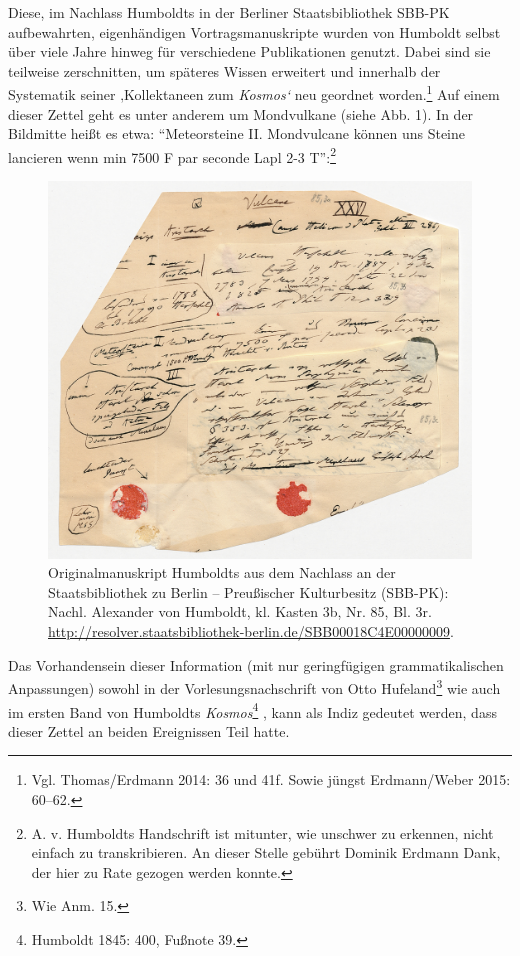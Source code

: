 \documentclass[output=paper]{langsci/langscibook}
\begin{document}
Diese, im Nachlass Humboldts in der Berliner Staatsbibliothek SBB-PK
aufbewahrten, eigenhändigen Vortragsmanuskripte wurden von Humboldt
selbst über viele Jahre hinweg für verschiedene Publikationen genutzt.
Dabei sind sie teilweise zerschnitten, um späteres Wissen erweitert und
innerhalb der Systematik seiner ‚Kollektaneen zum \emph{Kosmos`} neu
geordnet worden.\footnote{Vgl. Thomas/Erdmann 2014: 36 und 41f. Sowie
  jüngst Erdmann/Weber 2015: 60--62.} Auf einem dieser Zettel geht es
unter anderem um Mondvulkane (siehe Abb. 1). In der Bildmitte heißt es
etwa: \enquote{Meteorsteine II. Mondvulcane können uns Steine lancieren
wenn min 7500 F par seconde Lapl 2-3 T}:\footnote{A. v. Humboldts
  Handschrift ist mitunter, wie unschwer zu erkennen, nicht einfach zu
  transkribieren. An dieser Stelle gebührt Dominik Erdmann Dank, der
  hier zu Rate gezogen werden konnte.}

\begin{figure}[htbp]
\centering
\includegraphics[width=\textwidth]{figures/hug01.jpg}
\caption{Originalmanuskript Humboldts aus dem Nachlass an der
Staatsbibliothek zu Berlin -- Preußischer Kulturbesitz (SBB-PK): Nachl.
Alexander von Humboldt, kl. Kasten 3b, Nr. 85, Bl. 3r.
\url{http://resolver.staatsbibliothek-berlin.de/SBB00018C4E00000009}.}
\end{figure}

Das Vorhandensein dieser Information (mit nur geringfügigen
grammatikalischen Anpassungen) sowohl in der Vorlesungsnachschrift von
Otto Hufeland\footnote{Wie Anm. 15.} wie auch im ersten Band von
Humboldts \emph{Kosmos}\footnote{Humboldt 1845: 400, Fußnote 39.} , kann
als Indiz gedeutet werden, dass dieser Zettel an beiden Ereignissen Teil
hatte.
\end{document}
